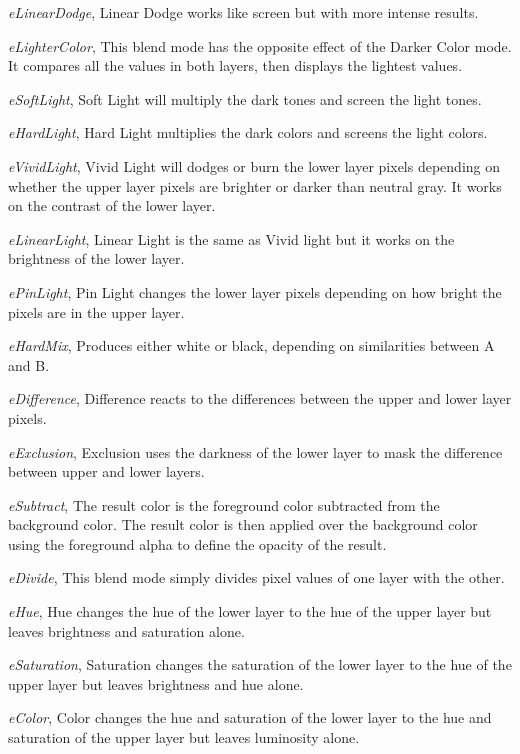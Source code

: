 \begin{DoxyItemize}
\item {\itshape e\+Linear\+Dodge}, Linear Dodge works like screen but with more intense results.
\item {\itshape e\+Lighter\+Color}, This blend mode has the opposite effect of the Darker Color mode. It compares all the values in both layers, then displays the lightest values.
\item {\itshape e\+Soft\+Light}, Soft Light will multiply the dark tones and screen the light tones.
\item {\itshape e\+Hard\+Light}, Hard Light multiplies the dark colors and screens the light colors.
\item {\itshape e\+Vivid\+Light}, Vivid Light will dodges or burn the lower layer pixels depending on whether the upper layer pixels are brighter or darker than neutral gray. It works on the contrast of the lower layer.
\item {\itshape e\+Linear\+Light}, Linear Light is the same as Vivid light but it works on the brightness of the lower layer.
\item {\itshape e\+Pin\+Light}, Pin Light changes the lower layer pixels depending on how bright the pixels are in the upper layer.
\item {\itshape e\+Hard\+Mix}, Produces either white or black, depending on similarities between A and B.
\item {\itshape e\+Difference}, Difference reacts to the differences between the upper and lower layer pixels.
\item {\itshape e\+Exclusion}, Exclusion uses the darkness of the lower layer to mask the difference between upper and lower layers.
\item {\itshape e\+Subtract}, The result color is the foreground color subtracted from the background color. The result color is then applied over the background color using the foreground alpha to define the opacity of the result.
\item {\itshape e\+Divide}, This blend mode simply divides pixel values of one layer with the other.
\item {\itshape e\+Hue}, Hue changes the hue of the lower layer to the hue of the upper layer but leaves brightness and saturation alone.
\item {\itshape e\+Saturation}, Saturation changes the saturation of the lower layer to the hue of the upper layer but leaves brightness and hue alone.
\item {\itshape e\+Color}, Color changes the hue and saturation of the lower layer to the hue and saturation of the upper layer but leaves luminosity alone.

\end{DoxyItemize}
